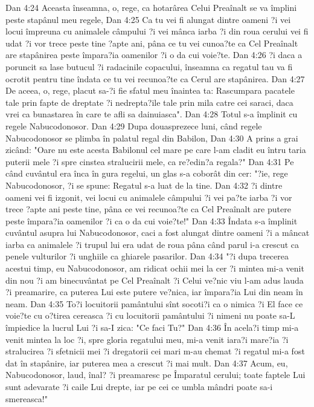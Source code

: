 Dan 4:24  Aceasta înseamna, o, rege, ca hotarârea Celui Preaînalt se va împlini peste stapânul meu regele,
Dan 4:25  Ca tu vei fi alungat dintre oameni ?i vei locui împreuna cu animalele câmpului ?i vei mânca iarba ?i din roua cerului vei fi udat ?i vor trece peste tine ?apte ani, pâna ce tu vei cunoa?te ca Cel Preaînalt are stapânirea peste împara?ia oamenilor ?i o da cui voie?te.
Dan 4:26  ?i daca a poruncit sa lase butucul ?i radacinile copacului, înseamna ca regatul tau va fi ocrotit pentru tine îndata ce tu vei recunoa?te ca Cerul are stapânirea.
Dan 4:27  De aceea, o, rege, placut sa-?i fie sfatul meu înaintea ta: Rascumpara pacatele tale prin fapte de dreptate ?i nedrepta?ile tale prin mila catre cei saraci, daca vrei ca bunastarea în care te afli sa dainuiasca".
Dan 4:28  Totul s-a împlinit cu regele Nabucodonosor.
Dan 4:29  Dupa douasprezece luni, când regele Nabucodonosor se plimba în palatul regal din Babilon,
Dan 4:30  A prins a grai zicând: "Oare nu este acesta Babilonul cel mare pe care l-am cladit eu întru taria puterii mele ?i spre cinstea stralucirii mele, ca re?edin?a regala?"
Dan 4:31  Pe când cuvântul era înca în gura regelui, un glas s-a coborât din cer: "?ie, rege Nabucodonosor, ?i se spune: Regatul s-a luat de la tine.
Dan 4:32  ?i dintre oameni vei fi izgonit, vei locui cu animalele câmpului ?i vei pa?te iarba ?i vor trece ?apte ani peste tine, pâna ce vei recunoa?te ca Cel Preaînalt are putere peste împara?ia oamenilor ?i ca o da cui voie?te!"
Dan 4:33  Îndata s-a împlinit cuvântul asupra lui Nabucodonosor, caci a fost alungat dintre oameni ?i a mâncat iarba ca animalele ?i trupul lui era udat de roua pâna când parul i-a crescut ca penele vulturilor ?i unghiile ca ghiarele pasarilor.
Dan 4:34  "?i dupa trecerea acestui timp, eu Nabucodonosor, am ridicat ochii mei la cer ?i mintea mi-a venit din nou ?i am binecuvântat pe Cel Preaînalt ?i Celui ve?nic viu l-am adus lauda ?i preamarire, ca puterea Lui este putere ve?nica, iar împara?ia Lui din neam în neam.
Dan 4:35  To?i locuitorii pamântului sînt socoti?i ca o nimica ?i El face ce voie?te cu o?tirea cereasca ?i cu locuitorii pamântului ?i nimeni nu poate sa-L împiedice la lucrul Lui ?i sa-I zica: "Ce faci Tu?"
Dan 4:36  În acela?i timp mi-a venit mintea la loc ?i, spre gloria regatului meu, mi-a venit iara?i mare?ia ?i stralucirea ?i sfetnicii mei ?i dregatorii cei mari m-au chemat ?i regatul mi-a fost dat în stapânire, iar puterea mea a crescut ?i mai mult.
Dan 4:37  Acum, eu, Nabucodonosor, laud, înal? ?i preamaresc pe Împaratul cerului; toate faptele Lui sunt adevarate ?i caile Lui drepte, iar pe cei ce umbla mândri poate sa-i smereasca!"
